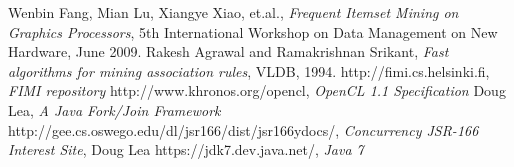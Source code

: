 \documentclass[conference]{IEEEtran}
\begin{document}






%
%
%
\begin{thebibliography}{1}
Wenbin Fang, Mian Lu, Xiangye Xiao, et.al., \emph{Frequent Itemset Mining on Graphics Processors}, 5th International Workshop on Data Management on New Hardware, June 2009.
Rakesh Agrawal and Ramakrishnan Srikant, \emph{Fast algorithms for mining association rules}, VLDB, 1994.
http://fimi.cs.helsinki.fi, \emph{FIMI repository}
http://www.khronos.org/opencl, \emph{OpenCL 1.1 Specification}
Doug Lea, \emph{A Java Fork/Join Framework}
http://gee.cs.oswego.edu/dl/jsr166/dist/jsr166ydocs/, \emph{Concurrency JSR-166 Interest Site}, Doug Lea
https://jdk7.dev.java.net/, \emph{Java 7}

\end{thebibliography}




\end{document}
